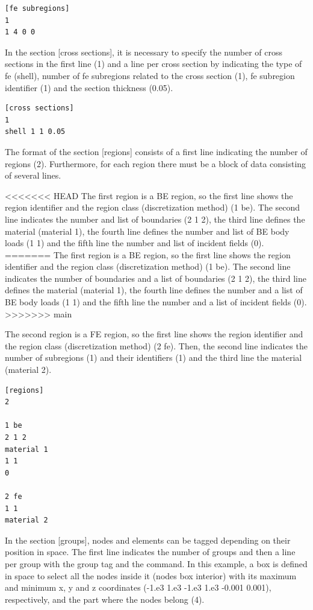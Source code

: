 \documentclass[a4]{article}
\begin{document}
\begin{Verbatim}
[fe subregions]
1
1 4 0 0
\end{Verbatim}

In the section [cross sections], it is necessary to specify the number of cross sections in the first line (1) and a line per cross section by indicating the type of fe (shell), number of fe subregions related to the cross section (1), fe subregion identifier (1) and the section thickness (0.05).

\begin{Verbatim}
[cross sections]
1
shell 1 1 0.05
\end{Verbatim}

The format of the section [regions] consists of a first line indicating the number of regions (2). Furthermore, for each region there must be a block of data consisting of several lines. 

<<<<<<< HEAD
The first region is a BE region, so the first line shows the region identifier and the region class (discretization method) (1 be). The second line indicates the number and list of boundaries (2 1 2), the third line defines the material (material 1), the fourth line defines the number and list of BE body loads (1 1) and the fifth line the number and list of incident fields (0).
=======
The first region is a BE region, so the first line shows the region identifier and the region class (discretization method) (1 be). The second line indicates the number of boundaries and a list of boundaries (2 1 2), the third line defines the material (material 1), the fourth line defines the number and a list of BE body loads (1 1) and the fifth line the number and a list of incident fields (0).
>>>>>>> main

The second region is a FE region, so the first line shows the region identifier and the region class (discretization method) (2 fe). Then, the second line indicates the number of subregions (1) and their identifiers (1) and the third line the material (material 2). 

\begin{Verbatim}	
[regions]
2

1 be
2 1 2
material 1 
1 1
0

2 fe
1 1
material 2 
\end{Verbatim}

In the section [groups], nodes and elements can be tagged depending on their position in space. The first line indicates the number of groups and then a line per group with the group tag and the command. In this example, a box is defined in space to select all the nodes inside it (nodes box interior) with its maximum and minimum x, y and z coordinates (-1.e3 1.e3 -1.e3 1.e3 -0.001 0.001), respectively, and the part where the nodes belong (4).    
\end{document}
